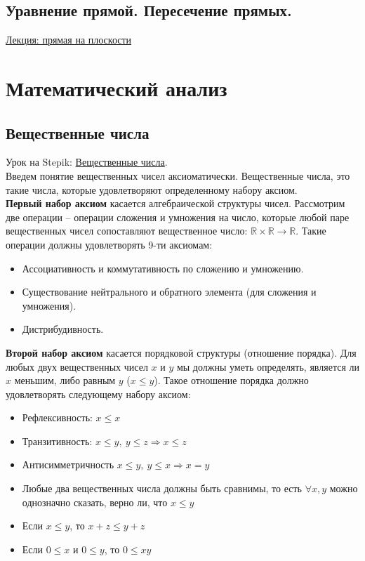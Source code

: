 \documentclass{article}
\begin{document}
\subsection{Уравнение прямой. Пересечение прямых.}

\href{https://portal.tpu.ru/SHARED/p/PEG/page_2/laag/Tab1/LAAG_Lecture-12.pdf}{Лекция: прямая на плоскости}

\section{Математический анализ}

\subsection{Вещественные числа}

Урок на Stepik: \href{https://stepik.org/lesson/28445/step/3?unit=9589}{Вещественные числа}. \\

Введем понятие вещественных чисел аксиоматически. Вещественные числа, это такие числа, которые удовлетворяют определенному набору аксиом. \\

\textbf{Первый набор аксиом} касается алгебраической структуры чисел. Рассмотрим две операции -- операции сложения и умножения на число, которые любой паре вещественных чисел сопоставляют вещественное число: $\mathbb{R} \times \mathbb{R} \to \mathbb{R}$. Такие операции должны удовлетворять 9-ти аксиомам:

\begin{itemize}
	\item Ассоциативность и коммутативность по сложению и умножению.
	\item Существование нейтрального и обратного элемента (для сложения и умножения).
	\item Дистрибудивность.
\end{itemize}

\textbf{Второй набор аксиом} касается порядковой структуры (отношение порядка). Для любых двух вещественных чисел $x$ и $y$ мы должны уметь определять, является ли $x$ меньшим, либо равным $y$ ($x \le y$). Такое отношение порядка должно удовлетворять следующему набору аксиом:

\begin{itemize}
	\item Рефлексивность: $x \le x$
	\item Транзитивность: $x \le y, \ y \le z \Rightarrow x \le z$
	\item Антисимметричность $x \le y, \ y \le x \Rightarrow x = y$
	\item Любые два вещественных числа должны быть сравнимы, то есть $\forall x, y$ можно однозначно сказать, верно ли, что $x \le y$
	\item Если $x \le y$, то $x + z \le y + z$
	\item Если $0 \le x$ и $0 \le y$, то $0 \le xy$
\end{itemize}
\end{document}
